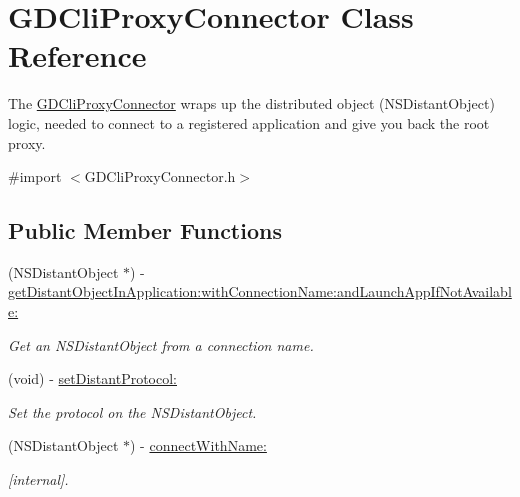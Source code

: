 \hypertarget{interface_g_d_cli_proxy_connector}{
\section{GDCliProxyConnector Class Reference}
\label{interface_g_d_cli_proxy_connector}
}


The \hyperlink{interface_g_d_cli_proxy_connector}{GDCliProxyConnector} wraps up the distributed object (NSDistantObject) logic, needed to connect to a registered application and give you back the root proxy.  


{\ttfamily \#import $<$GDCliProxyConnector.h$>$}\subsection*{Public Member Functions}
\begin{DoxyCompactItemize}
\item 
(NSDistantObject $\ast$) -\/ \hyperlink{interface_g_d_cli_proxy_connector_a4a9943173a516e776d4b8c7dfad1e3df}{getDistantObjectInApplication:withConnectionName:andLaunchAppIfNotAvailable:}
\begin{DoxyCompactList}\small\item\em Get an NSDistantObject from a connection name. \item\end{DoxyCompactList}\item 
(void) -\/ \hyperlink{interface_g_d_cli_proxy_connector_a0c52ccb54528284c3cc164ce5019232a}{setDistantProtocol:}
\begin{DoxyCompactList}\small\item\em Set the protocol on the NSDistantObject. \item\end{DoxyCompactList}\item 
\hypertarget{interface_g_d_cli_proxy_connector_a0661c0b89e7e650e08b1340be9c5da7f}{
(NSDistantObject $\ast$) -\/ \hyperlink{interface_g_d_cli_proxy_connector_a0661c0b89e7e650e08b1340be9c5da7f}{connectWithName:}}
\label{interface_g_d_cli_proxy_connector_a0661c0b89e7e650e08b1340be9c5da7f}

\begin{DoxyCompactList}\small\item\em \mbox{[}internal\mbox{]}. \item\end{DoxyCompactList}\end{DoxyCompactItemize}
